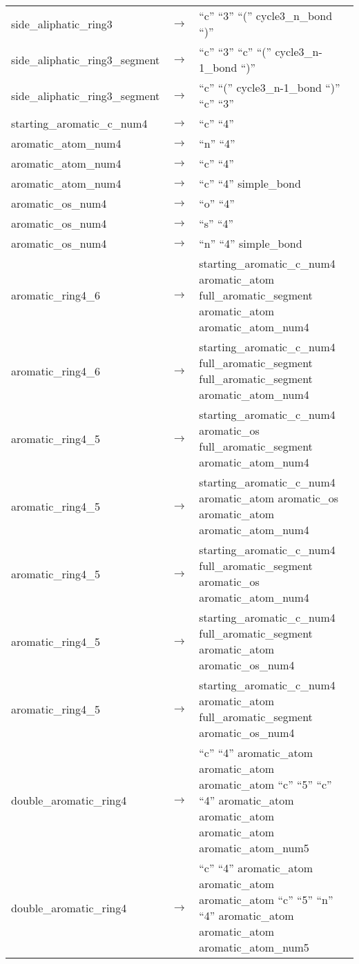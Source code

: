 \documentclass[../Document.tex]{subfiles}
\begin{document}
\begin{longtable}{m{} p{} p{}}
    side\_aliphatic\_ring3 & $\rightarrow$ & ``c'' ``3'' ``('' cycle3\_n\_bond ``)'' \\
    side\_aliphatic\_ring3\_segment & $\rightarrow$ & ``c'' ``3'' ``c'' ``('' cycle3\_n-1\_bond ``)'' \\
    side\_aliphatic\_ring3\_segment & $\rightarrow$ & ``c'' ``('' cycle3\_n-1\_bond ``)'' ``c'' ``3'' \\
    starting\_aromatic\_c\_num4 & $\rightarrow$ & ``c'' ``4'' \\
    aromatic\_atom\_num4 & $\rightarrow$ & ``n'' ``4'' \\
    aromatic\_atom\_num4 & $\rightarrow$ & ``c'' ``4'' \\
    aromatic\_atom\_num4 & $\rightarrow$ & ``c'' ``4'' simple\_bond \\
    aromatic\_os\_num4 & $\rightarrow$ & ``o'' ``4'' \\
    aromatic\_os\_num4 & $\rightarrow$ & ``s'' ``4'' \\
    aromatic\_os\_num4 & $\rightarrow$ & ``n'' ``4'' simple\_bond \\
    aromatic\_ring4\_6 & $\rightarrow$ & starting\_aromatic\_c\_num4 aromatic\_atom full\_aromatic\_segment aromatic\_atom aromatic\_atom\_num4 \\
    aromatic\_ring4\_6 & $\rightarrow$ & starting\_aromatic\_c\_num4 full\_aromatic\_segment full\_aromatic\_segment aromatic\_atom\_num4 \\
    aromatic\_ring4\_5 & $\rightarrow$ & starting\_aromatic\_c\_num4 aromatic\_os full\_aromatic\_segment aromatic\_atom\_num4 \\
    aromatic\_ring4\_5 & $\rightarrow$ & starting\_aromatic\_c\_num4 aromatic\_atom aromatic\_os aromatic\_atom aromatic\_atom\_num4 \\
    aromatic\_ring4\_5 & $\rightarrow$ & starting\_aromatic\_c\_num4 full\_aromatic\_segment aromatic\_os aromatic\_atom\_num4 \\
    aromatic\_ring4\_5 & $\rightarrow$ & starting\_aromatic\_c\_num4 full\_aromatic\_segment aromatic\_atom aromatic\_os\_num4 \\
    aromatic\_ring4\_5 & $\rightarrow$ & starting\_aromatic\_c\_num4 aromatic\_atom full\_aromatic\_segment aromatic\_os\_num4 \\
    double\_aromatic\_ring4 & $\rightarrow$ & ``c'' ``4'' aromatic\_atom aromatic\_atom aromatic\_atom ``c'' ``5'' ``c'' ``4'' aromatic\_atom aromatic\_atom aromatic\_atom aromatic\_atom\_num5 \\
    double\_aromatic\_ring4 & $\rightarrow$ & ``c'' ``4'' aromatic\_atom aromatic\_atom aromatic\_atom ``c'' ``5'' ``n'' ``4'' aromatic\_atom aromatic\_atom aromatic\_atom\_num5 \\

\end{longtable}
\end{document}

